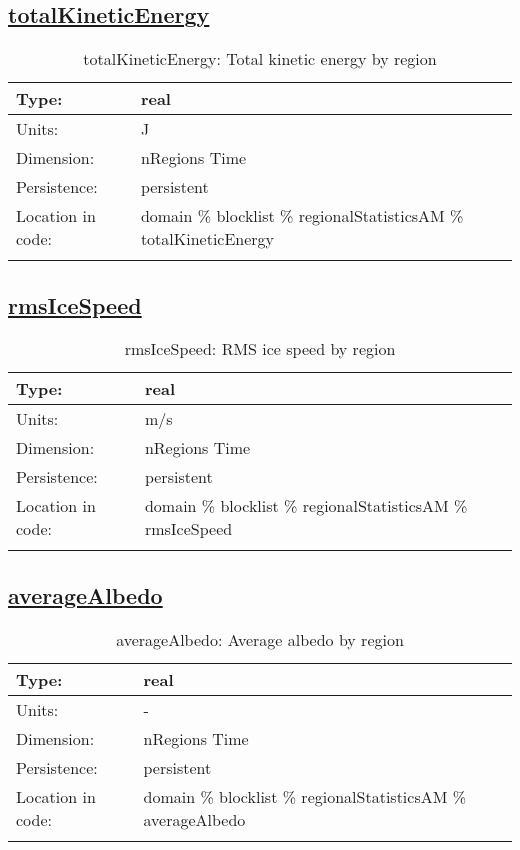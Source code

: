 \subsection[totalKineticEnergy]{\hyperref[sec:var_tab_regionalStatisticsAM]{totalKineticEnergy}}
\label{subsec:var_sec_regionalStatisticsAM_totalKineticEnergy}
\begin{center}
\begin{longtable}{| p{2.0in} | p{4.0in} |}
        \hline 
        Type: & real \\
        \hline 
        Units: & \si{J} \\
        \hline 
        Dimension: & nRegions Time \\
        \hline 
        Persistence: & persistent \\
        \hline 
         Location in code: & domain \% blocklist \% regionalStatisticsAM \% totalKineticEnergy \\
         \hline 
    \caption{totalKineticEnergy: Total kinetic energy by region}
\end{longtable}
\end{center}
\subsection[rmsIceSpeed]{\hyperref[sec:var_tab_regionalStatisticsAM]{rmsIceSpeed}}
\label{subsec:var_sec_regionalStatisticsAM_rmsIceSpeed}
\begin{center}
\begin{longtable}{| p{2.0in} | p{4.0in} |}
        \hline 
        Type: & real \\
        \hline 
        Units: & \si{m/s} \\
        \hline 
        Dimension: & nRegions Time \\
        \hline 
        Persistence: & persistent \\
        \hline 
         Location in code: & domain \% blocklist \% regionalStatisticsAM \% rmsIceSpeed \\
         \hline 
    \caption{rmsIceSpeed: RMS ice speed by region}
\end{longtable}
\end{center}
\subsection[averageAlbedo]{\hyperref[sec:var_tab_regionalStatisticsAM]{averageAlbedo}}
\label{subsec:var_sec_regionalStatisticsAM_averageAlbedo}
\begin{center}
\begin{longtable}{| p{2.0in} | p{4.0in} |}
        \hline 
        Type: & real \\
        \hline 
        Units: & \si{-} \\
        \hline 
        Dimension: & nRegions Time \\
        \hline 
        Persistence: & persistent \\
        \hline 
         Location in code: & domain \% blocklist \% regionalStatisticsAM \% averageAlbedo \\
         \hline 
    \caption{averageAlbedo: Average albedo by region}
\end{longtable}
\end{center}
